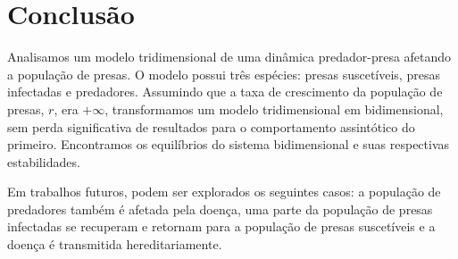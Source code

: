 \documentclass{article}
\begin{document}
\section{Conclusão}
Analisamos um modelo tridimensional de uma dinâmica predador-presa afetando a população de presas. O modelo possui três espécies: presas suscetíveis, presas infectadas e predadores. Assumindo que a taxa de crescimento da população de presas, $r$, era $+ \infty$, transformamos um modelo tridimensional em bidimensional, sem perda significativa de resultados para o comportamento assintótico do primeiro. Encontramos os equilíbrios do sistema bidimensional e suas respectivas estabilidades.

Em trabalhos futuros, podem ser explorados os seguintes casos: a população de predadores também é afetada pela doença, uma parte da população de presas infectadas se recuperam e retornam para a população de presas suscetíveis e a doença é transmitida hereditariamente. 
\printbibliography
\end{document}
